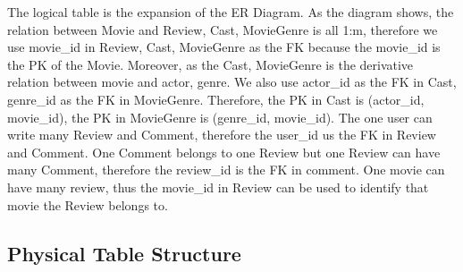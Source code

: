 \documentclass[12pt]{article}
\begin{document}
The logical table is the expansion of the ER Diagram.
As the diagram shows, the relation between Movie and Review, Cast, MovieGenre is all 1:m, therefore we use movie\_id in Review, Cast, MovieGenre as the FK because the movie\_id is the PK of the Movie. Moreover, as the Cast, MovieGenre is the derivative relation between movie and actor, genre. We also use actor\_id as the FK in Cast, genre\_id as the FK in MovieGenre. Therefore, the PK in Cast is (actor\_id, movie\_id), the PK in MovieGenre is (genre\_id, movie\_id).
The one user can write many Review and Comment, therefore the user\_id us the FK in Review and Comment. One Comment belongs to one Review but one Review can have many Comment, therefore the review\_id is the FK in comment. One movie can have many review, thus the movie\_id in Review can be used to identify that movie the Review belongs to.\\

\subsection{Physical Table Structure}
\end{document}
